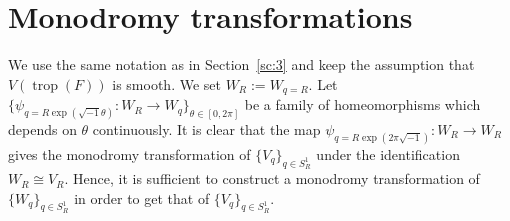 \documentclass[10pt,a4paper]{amsart}
\numberwithin{equation}{section}
\begin{document}
\section{Monodromy transformations}\label{sc:4}

We use the same notation as in Section~\ref{sc:3} and keep the assumption that $V(\operatorname{trop}(F))$ is smooth. We set $W_R:=W_{q=R}$. Let $\{\psi_{q=R\exp(\sqrt{-1}\theta)} \colon W_R \to W_q\}_{\theta \in [0,2\pi]}$ be a family of homeomorphisms which depends on $\theta$ continuously. It is clear that the map $\psi_{q=R\exp(2 \pi \sqrt{-1})} \colon W_R \to W_R$ gives the monodromy transformation of $\{V_q\}_{q \in S_R^1}$ under the identif\/ication $W_R \cong V_R$. Hence, it is suf\/f\/icient to construct a monodromy transformation of $\{W_q\}_{q \in S_R^1}$ in order to get that of $\{V_q\}_{q \in S_R^1}$.
\end{document}
